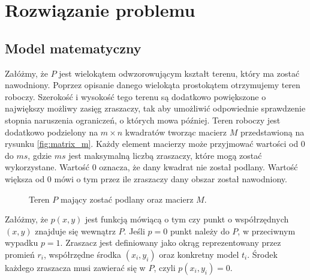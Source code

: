 \documentclass[twoside]{iisthesis}
\begin{document}
\chapter{Rozwiązanie problemu}
\section{Model matematyczny}
Załóżmy, że $P$ jest wielokątem odwzorowującym kształt terenu, który ma zostać nawodniony. Poprzez opisanie danego wielokąta prostokątem otrzymujemy teren roboczy. Szerokość i wysokość tego terenu są dodatkowo powiększone o największy możliwy zasięg zraszaczy, tak aby umożliwić odpowiednie sprawdzenie stopnia naruszenia ograniczeń, o których mowa później. Teren roboczy jest dodatkowo podzielony na $m \times n$ kwadratów tworząc macierz $M$ przedstawioną na rysunku \eqref{fig:matrix_m}. Każdy element macierzy może przyjmować wartości od 0 do $ms$, gdzie $ms$ jest maksymalną liczbą zraszaczy, które mogą zostać wykorzystane. Wartość 0 oznacza, że dany kwadrat nie został podlany. Wartość większa od 0 mówi o tym przez ile zraszaczy dany obszar został nawodniony.

\begin{figure}[!htb]
	\centering
	\caption{Teren $P$ mający zostać podlany oraz macierz $M$.}
	\label{fig:matrix_m}
\end{figure}
Załóżmy, że $p(x,y)$ jest funkcją mówiącą o tym czy punkt o współrzędnych $(x, y)$ znajduje się wewnątrz $P$. Jeśli $p = 0$ punkt należy do $P$, w przeciwnym wypadku $p=1$. Zraszacz jest definiowany jako okrąg reprezentowany przez promień $r_{i}$, współrzędne środka $(x_i, y_i)$ oraz konkretny model $t_{i}$. Środek każdego zraszacza musi zawierać się w $P$, czyli $p(x_{i}, y_{i}) = 0$.
\end{document}

